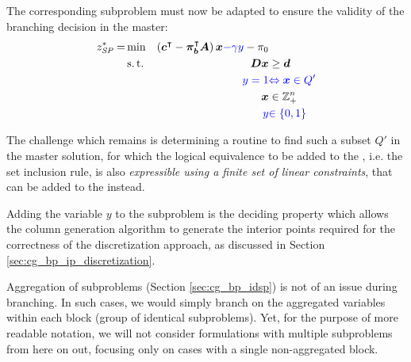 The corresponding subproblem must now be adapted to ensure the validity of the branching decision in the master:
\begin{equation}\label{eq:cg_bp_branchmaster_pricingmod}
\begin{aligned}
z^*_\SP{} = &\min & \left( \vec{c}\transpose - \vec{\pi}_\vec{b}\transpose \mat{A} \right) \vec{x} {\color{blue} - \gamma y} - \pi_0 & \\
&\st & \mat{D} \vec{x} & \geq \vec{d} \\
&& {\color{blue} y = 1} & {\color{blue} \Leftrightarrow \vec{x} \in Q'} \\
&& \vec{x} & \in \mathbb{Z}_+^n \\
&& {\color{blue} y} & {\color{blue} \in \{0, 1\}}
\end{aligned}
\end{equation}

The challenge which remains is determining a routine to find such a subset $Q'$ in the master solution, for which the logical equivalence to be added to the \SP{}, i.e. the set inclusion rule, is also \textit{expressible using a finite set of linear constraints}, that can be added to the \SP{} instead.

\begin{note}
Adding the variable $y$ to the subproblem is the deciding property which allows the column generation algorithm to generate the interior points required for the correctness of the discretization approach, as discussed in Section \ref{sec:cg_bp_ip_discretization}.
\end{note}

\begin{note}
Aggregation of subproblems (Section \ref{sec:cg_bp_idsp}) is not of an issue during branching. In such cases, we would simply branch on the aggregated variables within each block (group of identical subproblems). Yet, for the purpose of more readable notation, we will not consider formulations with multiple subproblems from here on out, focusing only on cases with a single non-aggregated block.
\end{note}

